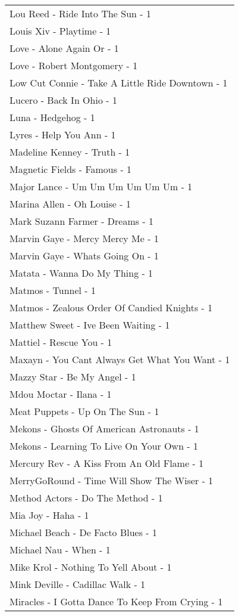 \documentclass[
]{article}
\begin{document}
\begin{longtable}{l}
Lou Reed - Ride Into The Sun - 1 \\ 
Louis Xiv - Playtime - 1 \\ 
Love - Alone Again Or - 1 \\ 
Love - Robert Montgomery - 1 \\ 
Low Cut Connie - Take A Little Ride Downtown - 1 \\ 
Lucero - Back In Ohio - 1 \\ 
Luna - Hedgehog - 1 \\ 
Lyres - Help You Ann - 1 \\ 
Madeline Kenney - Truth - 1 \\ 
Magnetic Fields - Famous - 1 \\ 
Major Lance - Um Um Um Um Um Um - 1 \\ 
Marina Allen - Oh Louise - 1 \\ 
Mark Suzann Farmer - Dreams - 1 \\ 
Marvin Gaye - Mercy Mercy Me - 1 \\ 
Marvin Gaye - Whats Going On - 1 \\ 
Matata - Wanna Do My Thing - 1 \\ 
Matmos - Tunnel - 1 \\ 
Matmos - Zealous Order Of Candied Knights - 1 \\ 
Matthew Sweet - Ive Been Waiting - 1 \\ 
Mattiel - Rescue You - 1 \\ 
Maxayn - You Cant Always Get What You Want - 1 \\ 
Mazzy Star - Be My Angel - 1 \\ 
Mdou Moctar - Ilana - 1 \\ 
Meat Puppets - Up On The Sun - 1 \\ 
Mekons - Ghosts Of American Astronauts - 1 \\ 
Mekons - Learning To Live On Your Own - 1 \\ 
Mercury Rev - A Kiss From An Old Flame - 1 \\ 
MerryGoRound - Time Will Show The Wiser - 1 \\ 
Method Actors - Do The Method - 1 \\ 
Mia Joy - Haha - 1 \\ 
Michael Beach - De Facto Blues - 1 \\ 
Michael Nau - When - 1 \\ 
Mike Krol - Nothing To Yell About - 1 \\ 
Mink Deville - Cadillac Walk - 1 \\ 
Miracles - I Gotta Dance To Keep From Crying - 1 \\ 

\end{longtable}
\end{document}
